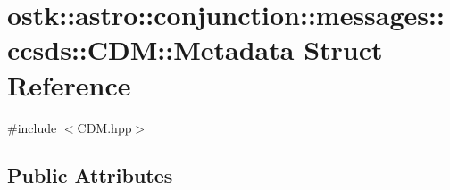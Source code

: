 \hypertarget{structostk_1_1astro_1_1conjunction_1_1messages_1_1ccsds_1_1_c_d_m_1_1_metadata}{}\section{ostk\+:\+:astro\+:\+:conjunction\+:\+:messages\+:\+:ccsds\+:\+:C\+DM\+:\+:Metadata Struct Reference}
\label{structostk_1_1astro_1_1conjunction_1_1messages_1_1ccsds_1_1_c_d_m_1_1_metadata}


{\ttfamily \#include $<$C\+D\+M.\+hpp$>$}

\subsection*{Public Attributes}
